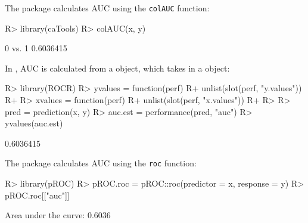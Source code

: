 \documentclass[article]{jss}
\begin{document}
The  package calculates AUC using the \texttt{colAUC}
function:

\begin{CodeChunk}

\begin{CodeInput}
R> library(caTools)
R> colAUC(x, y)
\end{CodeInput}

\begin{CodeOutput}
             [,1]
0 vs. 1 0.6036415
\end{CodeOutput}
\end{CodeChunk}

In , AUC is calculated from a  object, which
takes in a  object:

\begin{CodeChunk}

\begin{CodeInput}
R> library(ROCR)
R> yvalues = function(perf) {
R+   unlist(slot(perf, "y.values"))
R+ }
R> xvalues = function(perf) {
R+   unlist(slot(perf, "x.values"))
R+ }
R> 
R> pred = prediction(x, y)
R> auc.est = performance(pred, "auc")
R> yvalues(auc.est)
\end{CodeInput}

\begin{CodeOutput}
[1] 0.6036415
\end{CodeOutput}
\end{CodeChunk}

The  package calculates AUC using the \texttt{roc} function:

\begin{CodeChunk}

\begin{CodeInput}
R> library(pROC)
R> pROC.roc = pROC::roc(predictor = x, response = y)
R> pROC.roc[["auc"]]
\end{CodeInput}

\begin{CodeOutput}
Area under the curve: 0.6036
\end{CodeOutput}
\end{CodeChunk}
\end{document}
